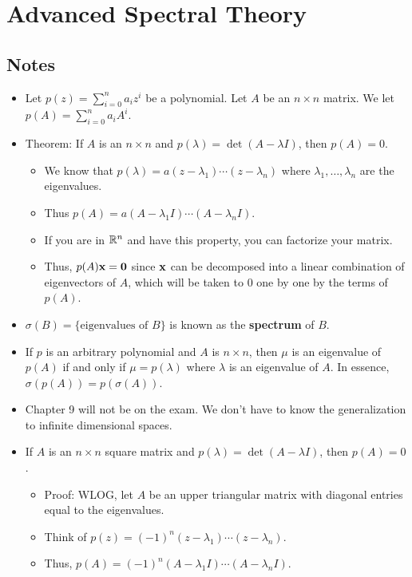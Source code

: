 \documentclass[../../notes.tex]{subfiles}
\begin{document}
\chapter{Advanced Spectral Theory}
\section{Notes}
\begin{itemize}
    \item {}Let $p(z)=\sum_{i=0}^na_iz^i$ be a polynomial. Let $A$ be an $n\times n$ matrix. We let $p(A)=\sum_{i=0}^na_iA^i$.
    \item Theorem: If $A$ is an $n\times n$ and $p(\lambda)=\det(A-\lambda I)$, then $p(A)=0$.
    \begin{itemize}
        \item We know that $p(\lambda)=a(z-\lambda_1)\cdots(z-\lambda_n)$ where $\lambda_1,\dots,\lambda_n$ are the eigenvalues.
        \item Thus $p(A)=a(A-\lambda_1I)\cdots(A-\lambda_nI)$.
        \item If you are in $\mathbb{R}^n$ and have this property, you can factorize your matrix.
        \item Thus, $p(A)\mathbf{x}=\bm{0}$ since $\mathbf{x}$ can be decomposed into a linear combination of eigenvectors of $A$, which will be taken to 0 one by one by the terms of $p(A)$.
    \end{itemize}
    \item $\sigma(B)=\{\text{eigenvalues of }B\}$ is known as the \textbf{spectrum} of $B$.
    \item If $p$ is an arbitrary polynomial and $A$ is $n\times n$, then $\mu$ is an eigenvalue of $p(A)$ if and only if $\mu=p(\lambda)$ where $\lambda$ is an eigenvalue of $A$. In essence, $\sigma(p(A))=p(\sigma(A))$.
    \item Chapter 9 will not be on the exam. We don't have to know the generalization to infinite dimensional spaces.
    \item {}If $A$ is an $n\times n$ square matrix and $p(\lambda)=\det(A-\lambda I)$, then $p(A)=0$.
    \begin{itemize}
        \item Proof: WLOG, let $A$ be an upper triangular matrix with diagonal entries equal to the eigenvalues.
        \item Think of $p(z)=(-1)^n(z-\lambda_1)\cdots(z-\lambda_n)$.
        \item Thus, $p(A)=(-1)^n(A-\lambda_1I)\cdots(A-\lambda_nI)$.

\end{itemize}
\end{itemize}
\end{document}
